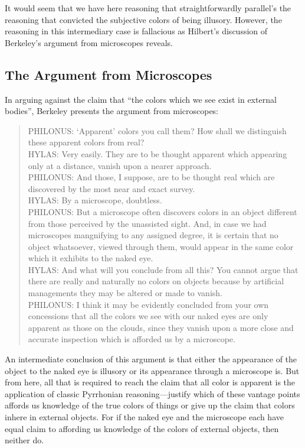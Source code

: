 \documentclass[12pt]{article}
\begin{document}
It would seem that we have here reasoning that straightforwardly parallel's the reasoning that convicted the subjective colors of being illusory. However, the reasoning in this intermediary case is fallacious as Hilbert's \citeyear{Hilbert:1987jq} discussion of Berkeley's \citeyear{Berkeley:1734fk} argument from microscopes reveals.


\subsection{The Argument from Microscopes}\label{sub:the_argument_from_microscopes} %

In arguing against the claim that ``the colors which we see exist in external bodies'', Berkeley presents the argument from microscopes:
	\begin{quote}
		PHILONUS: `Apparent' colors you call them? How shall we distinguish these apparent colors from real?\\
		HYLAS: Very easily. They are to be thought apparent which appearing only at a distance, vanish upon a nearer approach.\\
		PHILONUS: And those, I suppose, are to be thought real which are discovered by the most near and exact survey.\\
		HYLAS: By a microscope, doubtless.\\
		PHILONUS: But a microscope often discovers colors in an object different from those perceived by the unassisted sight. And, in case we had microscopes mangnifying to any assigned degree, it is certain that no object whatsoever, viewed through them, would appear in the same color which it exhibits to the naked eye.\\
		HYLAS: And what will you conclude from all this? You cannot argue that there are really and naturally no colors on objects because by artificial managements they may be altered or made to vanish.\\
		PHILONUS: I think it may be evidently concluded from your own concessions that all the colors we see with our naked eyes are only apparent as those on the clouds, since they vanish upon a more close and accurate inspection which is afforded us by a microscope. \citep[xx]{Berkeley:1734fk}
	\end{quote}
An intermediate conclusion of this argument is that either the appearance of the object to the naked eye is illusory or its appearance through a microscope is. But from here, all that is required to reach the claim that all color is apparent is the application of classic Pyrrhonian reasoning---justify which of these vantage points affords us knowledge of the true colors of things or give up the claim that colors inhere in external objects. For if the naked eye and the microscope each have equal claim to affording us knowledge of the colors of external objects, then neither do.
\end{document}
